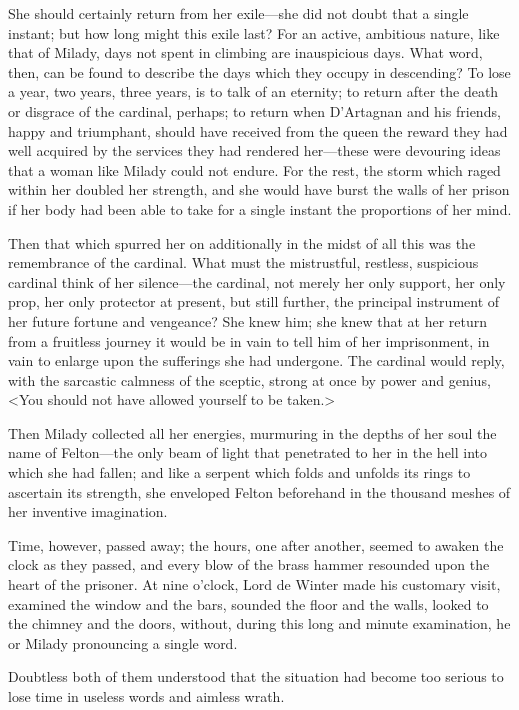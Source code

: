 She should certainly return from her exile—she did not doubt that a single instant; but how long might this exile last? For an active, ambitious nature, like that of Milady, days not spent in climbing are inauspicious days. What word, then, can be found to describe the days which they occupy in descending? To lose a year, two years, three years, is to talk of an eternity; to return after the death or disgrace of the cardinal, perhaps; to return when D'Artagnan and his friends, happy and triumphant, should have received from the queen the reward they had well acquired by the services they had rendered her—these were devouring ideas that a woman like Milady could not endure. For the rest, the storm which raged within her doubled her strength, and she would have burst the walls of her prison if her body had been able to take for a single instant the proportions of her mind. 

Then that which spurred her on additionally in the midst of all this was the remembrance of the cardinal. What must the mistrustful, restless, suspicious cardinal think of her silence—the cardinal, not merely her only support, her only prop, her only protector at present, but still further, the principal instrument of her future fortune and vengeance? She knew him; she knew that at her return from a fruitless journey it would be in vain to tell him of her imprisonment, in vain to enlarge upon the sufferings she had undergone. The cardinal would reply, with the sarcastic calmness of the sceptic, strong at once by power and genius, <You should not have allowed yourself to be taken.> 

Then Milady collected all her energies, murmuring in the depths of her soul the name of Felton—the only beam of light that penetrated to her in the hell into which she had fallen; and like a serpent which folds and unfolds its rings to ascertain its strength, she enveloped Felton beforehand in the thousand meshes of her inventive imagination. 

Time, however, passed away; the hours, one after another, seemed to awaken the clock as they passed, and every blow of the brass hammer resounded upon the heart of the prisoner. At nine o'clock, Lord de Winter made his customary visit, examined the window and the bars, sounded the floor and the walls, looked to the chimney and the doors, without, during this long and minute examination, he or Milady pronouncing a single word. 

Doubtless both of them understood that the situation had become too serious to lose time in useless words and aimless wrath. 

